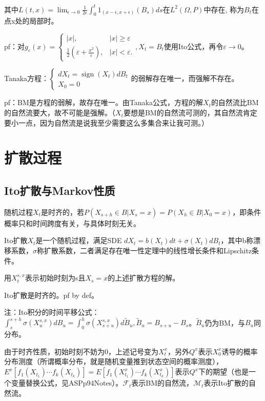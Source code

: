 其中$L(t, x)=\lim _{\epsilon \rightarrow 0} \frac{1}{2 \epsilon} \int_{0}^{t} 1_{(x-\epsilon, x+\epsilon)}\left(B_{s}\right) d s$在$L^{2}(\Omega, P)$中存在, 称为$B_{t}$在点x处的局部时。

pf：对$g_{\varepsilon}(x)=\left\{\begin{array}{ll}
  |x|, & |x| \geq \varepsilon \\
  \frac{1}{2}\left(\varepsilon+\frac{x^{2}}{\varepsilon}\right), & |x|<\varepsilon .
\end{array}\right. , X_t = B_t$使用Ito公式，再令$\varepsilon \to 0$。

Tanaka方程：$\left\{\begin{array}{ll}
  d X_{t}=\operatorname{sign}\left(X_{t}\right) d B_{t} \\
  X_{0}=0
\end{array}\right.$的弱解存在唯一，而强解不存在。

pf：BM是方程的弱解，故存在唯一。由Tanaka公式，方程的解$X_t$的自然流比BM的自然流要大，故不可能是强解。（$X_t$要想是BM的自然流可测的，其自然流肯定要小一点，因为自然流是说我至少需要这么多集合来让我可测。）

\section{扩散过程}

\subsection{Ito扩散与Markov性质}

随机过程$X_t$是时齐的，若$P\left(X_{s+h} \in B | X_{s}=x\right)=P\left(X_{h} \in B | X_{0}=x\right)$，即条件概率只和时间跨度有关，与具体时刻无关。

Ito扩散$X_t$是一个随机过程，满足SDE $d X_{t}=b\left(X_{t}\right) d t+\sigma\left(X_{t}\right) d B_{t}$，其中b称漂移系数，$\sigma$称扩散系数，二者满足存在唯一性定理中的线性增长条件和Lipschitz条件。

用$X_t^{s, x}$表示初始时刻为s且$X_s = x$的上述扩散方程的解。

Ito扩散是时齐的。pf by def。

注：Ito积分的时间平移公式：$\int_s^{s + h} \sigma(X_{u}^{s, x}) dB_u = \int_0^h \sigma(X_{s + u}^{s, x}) d\widetilde{B}_u, \widetilde{B}_u = B_{s + u} - B_s$。$\widetilde{B}_u$仍为BM，与$B_u$同分布。

由于时齐性质，初始时刻不妨为0，上述记号变为$X_t^x$，另外$Q^x$表示$X_0^x$诱导的概率分布测度（所谓概率分布，就是随机变量推到状态空间的概率测度），$E^{x}\left[f_{1}\left(X_{t_{1}}\right) \cdots f_{k}\left(X_{t_{k}}\right)\right]=E\left[f_{1}\left(X_{t_{1}}^{x}\right) \cdots f_{k}\left(X_{t_{k}}^{x}\right)\right]$表示$Q^x$下的期望（也是一个变量替换公式，见ASPp94Notes）。$\mathcal{F}_t$表示BM的自然流，$\mathcal{M}_t$表示Ito扩散的自然流。


